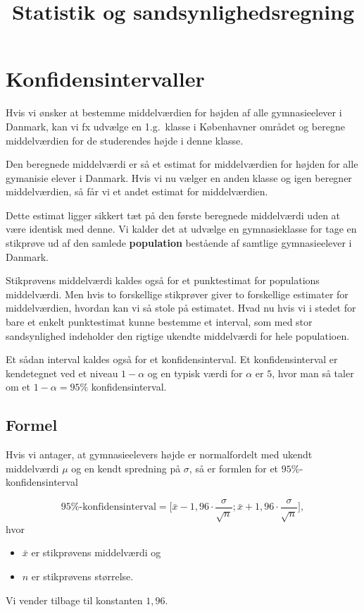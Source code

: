 \documentclass[11pt, a4paper]{article}
\date{}
\title{Statistik og sandsynlighedsregning}
\begin{document}
\maketitle

\section{Konfidensintervaller}
Hvis vi ønsker at bestemme middelværdien for højden af alle gymnasieelever i
Danmark, kan vi fx udvælge en 1.g.\ klasse i Københavner området og beregne
middelværdien for de studerendes højde i denne klasse.

Den beregnede middelværdi er så et estimat for middelværdien for højden for alle
gymanisie elever i Danmark. Hvis vi nu vælger en anden klasse og igen beregner
middelværdien, så får vi et andet estimat for middelværdien.

Dette estimat ligger sikkert tæt på den første beregnede middelværdi uden at være
identisk med denne. Vi kalder det at udvælge en gymnasieklasse for tage en stikprøve
ud af den samlede \textbf{population} bestående af samtlige gymnasieelever i Danmark.

Stikprøvens middelværdi kaldes også for et punktestimat for populations
middelværdi. Men hvis to forskellige stikprøver giver to forskellige estimater for
middelværdien, hvordan kan vi så stole på estimatet. Hvad nu hvis vi i stedet for
bare et enkelt punktestimat kunne bestemme et interval, som med stor sandsynlighed
indeholder den rigtige ukendte middelværdi for hele populatioen.

Et sådan interval kaldes også for et konfidensinterval. Et konfidensinterval er
kendetegnet ved et niveau \(1 - \alpha\) og en typisk værdi for \(\alpha\) er \(5\),
hvor man så taler om et \(1-\alpha = 95\%\) konfidensinterval.

\subsection{Formel}
Hvis vi antager, at gymnasieelevers højde er normalfordelt med ukendt middelværdi
\(\mu\) og en kendt spredning på \(\sigma\), så er formlen for et
\(95\%\)-konfidens\-interval

\begin{equation}
  95\%\mbox{-konfidensinterval} = \Big[\bar{x} - 1,96⋅\frac{\sigma}{\sqrt{n}};
  \bar{x} +1,96⋅\frac{\sigma}{\sqrt{n}} \Big],
\end{equation}
hvor
\begin{itemize}
  \item \(\bar{x}\) er stikprøvens middelværdi og
  \item \(n\) er stikprøvens størrelse.
\end{itemize}
Vi vender tilbage til konstanten \(1,96\).
\end{document}
